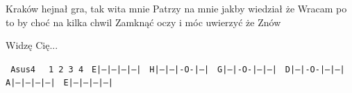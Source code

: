\documentclass[../../../songbook.tex]{subfiles}
\begin{document}
Kraków hejnał gra, tak wita mnie \newline
Patrzy na mnie jakby wiedział że \newline
Wracam po to by choć na kilka chwil \newline
Zamknąć oczy i móc uwierzyć że \newline
Znów \newline

\-\hspace{1cm} Widzę Cię... \newline

  \texttt{       Asus4      }	\newline         
  \texttt{  1   2   3   4     }	\newline  
 \texttt{E|---|---|---|---|  }	\newline 
 \texttt{H|---|---|-O-|---|   }	\newline
 \texttt{G|---|-O-|---|---|   }	\newline
 \texttt{D|---|-O-|---|---|   }	\newline
 \texttt{A|---|---|---|---|   }	\newline
 \texttt{E|---|---|---|---| }
\end{document}
